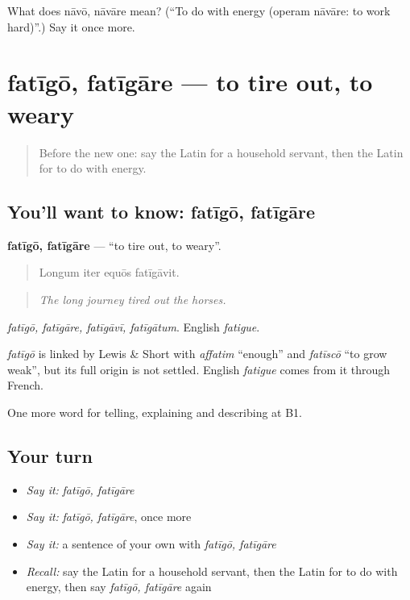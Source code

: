 \begin{tcolorbox}[breakable,colback=teal!4,colframe=teal!35!black,title={Before you move on}]
What does nāvō, nāvāre mean? (\textquotedblleft{}To do with energy (operam nāvāre: to work hard)\textquotedblright{}.) Say it once more.
\end{tcolorbox}
\section[fatīgō, fatīgāre]{fatīgō, fatīgāre — to tire out, to weary}

\label{lesson:LA-C380-fatigo}



\begin{quote}
Before the new one: say the Latin for a household servant, then the Latin for to do with energy.
\end{quote}

\subsection*{You'll want to know: fatīgō, fatīgāre}
\textbf{fatīgō, fatīgāre} — \textquotedblleft{}to tire out, to weary\textquotedblright{}.

\begin{quote}
Longum iter equōs fatīgāvit.
\end{quote}

\begin{quote}
\emph{The long journey tired out the horses.}
\end{quote}

\emph{fatīgō, fatīgāre, fatīgāvī, fatīgātum}. English \emph{fatigue}.

\begin{cousinweb}
\emph{fatīgō} is linked by Lewis \& Short with \emph{affatim} \textquotedblleft{}enough\textquotedblright{} and \emph{fatīscō} \textquotedblleft{}to grow weak\textquotedblright{}, but its full origin is not settled. English \emph{fatigue} comes from it through French.
\end{cousinweb}

\begin{grammarlens}[title={What you've built}]
One more word for telling, explaining and describing at B1.
\end{grammarlens}

\subsection*{Your turn}
\begin{itemize}
\raggedright
  \item \emph{Say it:} \emph{fatīgō, fatīgāre}
  \item \emph{Say it:} \emph{fatīgō, fatīgāre}, once more
  \item \emph{Say it:} a sentence of your own with \emph{fatīgō, fatīgāre}
  \item \emph{Recall:} say the Latin for a household servant, then the Latin for to do with energy, then say \emph{fatīgō, fatīgāre} again
\end{itemize}

